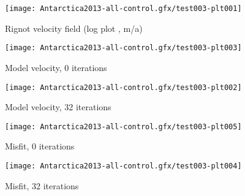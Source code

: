 \documentclass{article}
\begin{document}
\begin{center}
\texttt{[image: Antarctica2013-all-control.gfx/test003-plt001]}
\end{center}

Rignot velocity field (log plot , m/a)

\begin{center}
\texttt{[image: Antarctica2013-all-control.gfx/test003-plt003]}
\end{center}

Model velocity, 0 iterations

\begin{center}
\texttt{[image: Antarctica2013-all-control.gfx/test003-plt002]}
\end{center}

Model velocity, 32 iterations

\begin{center}
\texttt{[image: Antarctica2013-all-control.gfx/test003-plt005]}
\end{center}
Misfit, 0 iterations

\begin{center}
\texttt{[image: Antarctica2013-all-control.gfx/test003-plt004]}
\end{center}
Misfit, 32 iterations



\end{document}
